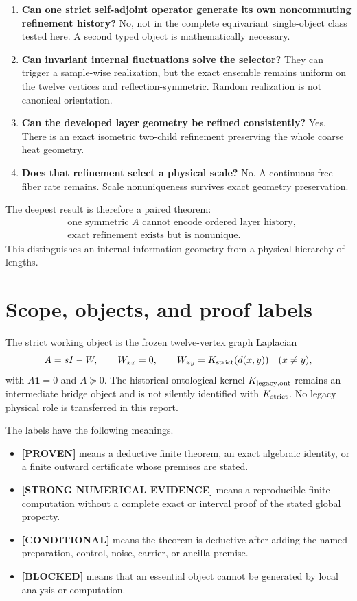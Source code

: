 \documentclass[11pt,a4paper]{article}
\newcommand{\Proven}{\textcolor{proved}{\textbf{[PROVEN]}}}
\newcommand{\Evidence}{\textcolor{conditional}{\textbf{[STRONG NUMERICAL EVIDENCE]}}}
\newcommand{\Conditional}{\textcolor{conditional}{\textbf{[CONDITIONAL]}}}
\newcommand{\Blocked}{\textcolor{blocked}{\textbf{[BLOCKED]}}}
\begin{document}
\begin{enumerate}
\item \textbf{Can one strict self-adjoint operator generate its own noncommuting refinement
history?} No, not in the complete equivariant single-object class tested here. A second
typed object is mathematically necessary.
\item \textbf{Can invariant internal fluctuations solve the selector?} They can trigger a
sample-wise realization, but the exact ensemble remains uniform on the twelve vertices and
reflection-symmetric. Random realization is not canonical orientation.
\item \textbf{Can the developed layer geometry be refined consistently?} Yes. There is an
exact isometric two-child refinement preserving the whole coarse heat geometry.
\item \textbf{Does that refinement select a physical scale?} No. A continuous free fiber
rate remains. Scale nonuniqueness survives exact geometry preservation.
\end{enumerate}

The deepest result is therefore a paired theorem:
\begin{align*}
&\boxed{\text{one symmetric }A\text{ cannot encode ordered layer history}},\\
&\boxed{\text{exact refinement exists but is nonunique}.}
\end{align*}
This distinguishes an internal information geometry from a physical hierarchy of lengths.

\section{Scope, objects, and proof labels}

The strict working object is the frozen twelve-vertex graph Laplacian
\[
A=sI-W,\qquad W_{xx}=0,\qquad
W_{xy}=K_{\rm strict}(d(x,y))\quad(x\ne y),
\]
with $A\bm 1=0$ and $A\succeq0$. The historical ontological kernel
$K_{\rm legacy,ont}$ remains an intermediate bridge object and is not silently identified
with $K_{\rm strict}$. No legacy physical role is transferred in this report.

The labels have the following meanings.

\begin{itemize}
\item \Proven{} means a deductive finite theorem, an exact algebraic identity, or a finite
outward certificate whose premises are stated.
\item \Evidence{} means a reproducible finite computation without a complete exact or
interval proof of the stated global property.
\item \Conditional{} means the theorem is deductive after adding the named preparation,
control, noise, carrier, or ancilla premise.
\item \Blocked{} means that an essential object cannot be generated by local analysis or
computation.
\end{itemize}
\end{document}

